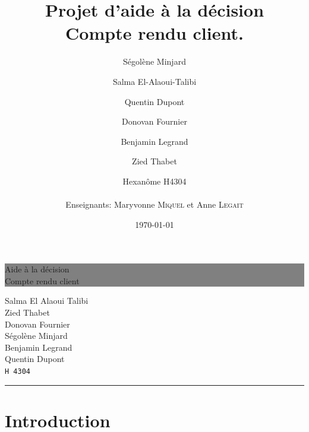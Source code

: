 \documentclass[12pt]{article}
\title{Projet d'aide à la décision \\ Compte rendu client.}
\date{\today}
\author{Ségolène Minjard \and Salma El-Alaoui-Talibi \and Quentin Dupont \and Donovan Fournier \and Benjamin Legrand \and Zied Thabet \and Hexanôme H4304 \\ \\ Enseignants: Maryvonne \textsc{Miquel}
et Anne \textsc{Legait}  }
\newcommand{\HRule}[1]{\hfill \rule{0.2\linewidth}{#1}} %
\begin{document}
\thispagestyle{empty} %

\renewcommand{\labelitemi}{$\bullet$}
\colorbox{grey}{
	\parbox[t]{1.0\linewidth}{
		\centering \fontsize{40pt}{80pt}\selectfont %
		\vspace*{0.7cm} %
		
		\hfill Aide à la décision \\
		\hfill Compte rendu client\par
		
		\vspace*{0.7cm} %
	}
}


\vfill %


{\centering \large 
\hfill Salma El Alaoui Talibi \\
\hfill Zied Thabet \\
\hfill Donovan Fournier \\
\hfill Ségolène Minjard \\
\hfill Benjamin Legrand \\
\hfill Quentin Dupont \\
\hfill \texttt{H 4304} \\

\HRule{1.5pt}} %


\clearpage %

\vspace{25pt}
\setcounter{tocdepth}{2}
\tableofcontents %
\pagebreak
\section{Introduction}
\end{document}
